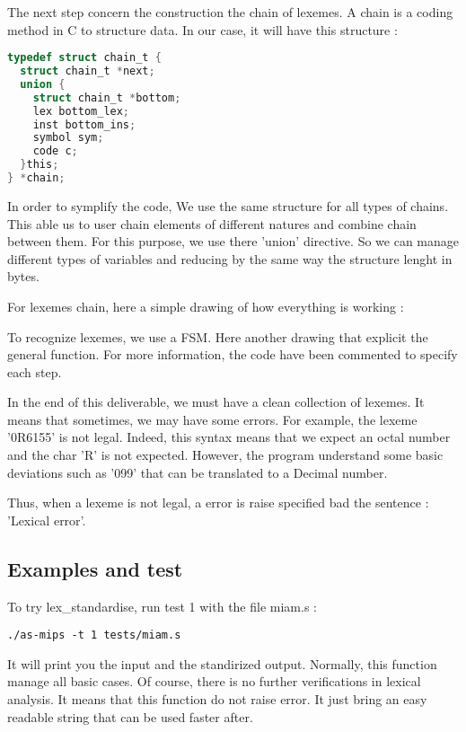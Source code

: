 \documentclass[twoside,twocolumn]{article}
\begin{document}
The next step concern the construction the chain of lexemes. A chain is a coding method in C to structure data. In our case, it will have this structure :

\begin{lstlisting}[language=C]
typedef struct chain_t {
  struct chain_t *next;
  union {
    struct chain_t *bottom;
    lex bottom_lex;
    inst bottom_ins;
    symbol sym;
    code c;
  }this;
} *chain;
\end{lstlisting}

In order to symplify the code, We use the same structure for all types of chains. This able us to user chain elements of different natures and combine chain between them. For this purpose, we use there 'union' directive. So we can manage different types of variables and reducing by the same way the structure lenght in bytes.

For lexemes chain, here a simple drawing of how everything is working :


To recognize lexemes, we use a FSM. Here another drawing that explicit the general function. For more information, the code have been commented to specify each step.


In the end of this deliverable, we must have a clean collection of lexemes. It means that sometimes, we may have some errors. For example, the lexeme '0R6155' is not legal. Indeed, this syntax means that we expect an octal number and the char 'R' is not expected. However, the program understand some basic deviations such as '099' that can be translated to a Decimal number.

Thus, when a lexeme is not legal, a error is raise specified bad the sentence : 'Lexical error'.


\subsection{Examples and test}

To try lex\_standardise, run test 1 with the file miam.s :

\begin{lstlisting}
./as-mips -t 1 tests/miam.s
\end{lstlisting}

It will print you the input and the standirized output. Normally, this function manage all basic cases. Of course, there is no further verifications in lexical analysis. It means that this function do not raise error. It just bring an easy readable string that can be used faster after.
\end{document}
